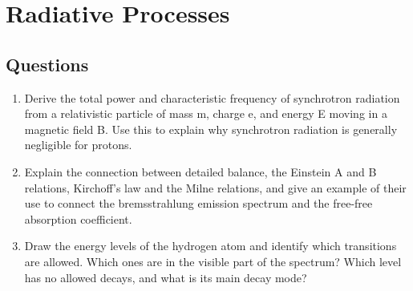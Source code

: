 \section{Radiative Processes}
\subsection{Questions}
\begin{enumerate}
\item Derive the total power and characteristic frequency of synchrotron radiation from
      a relativistic particle of mass m, charge e, and energy E moving in a magnetic field B.
      Use this to explain why synchrotron radiation is generally negligible for protons.
\item Explain the connection between detailed balance, the Einstein A and B relations,
      Kirchoff's law and the Milne relations, and give an example of their use to connect the
      bremsstrahlung emission spectrum and the free-free absorption coefficient.
\item Draw the energy levels of the hydrogen atom and identify which transitions are
      allowed. Which ones are in the visible part of the spectrum? Which level has no
      allowed decays, and what is its main decay mode?
\end{enumerate}
